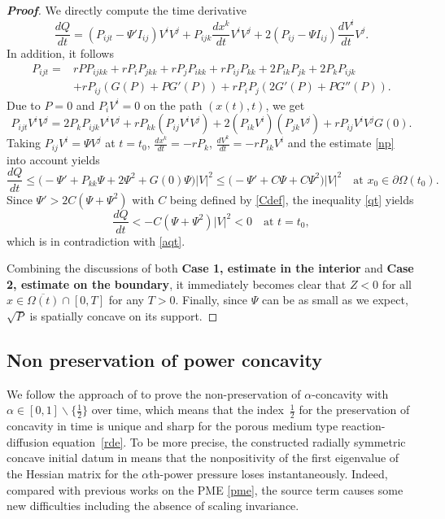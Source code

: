 \documentclass[10pt]{article}         %
\numberwithin{equation}{section}
\begin{document}
\begin{proof}[\bf Proof]
We directly compute the time derivative 
\[\frac{dQ}{dt}=(P_{ijt}-\Psi' I_{ij})V^iV^j+P_{ijk}\frac{dx^k}{dt}V^iV^j+2(P_{ij}-\Psi I_{ij})\frac{dV^i}{dt}V^j.\]
In addition, it follows 
\begin{equation*}
\begin{aligned}P_{ijt}=&rPP_{ijkk}+rP_iP_{jkk}+rP_jP_{ikk}+rP_{ij}P_{kk}+2P_{ik}P_{jk}+2P_{k}P_{ijk}\\
&+rP_{ij}(G(P)+PG'(P))+rP_iP_j(2G'(P)+PG''(P)).
\end{aligned}
\end{equation*}
Due to $P=0$ and $P_iV^i=0$ on the path $(x(t),t)$, we get 
\[P_{ijt}V^iV^j=2P_{k}P_{ijk}V^iV^j+rP_{kk}(P_{ij}V^iV^j)+2(P_{ik}V^i)(P_{jk}V^j)+rP_{ij}V^iV^jG(0).\]
Taking  $P_{ij}V^i=\Psi V^j$ at $t=t_0$, $\frac{dx^k}{dt}=-rP_k$, $\frac{dV^k}{dt}=-rP_{ik}V^i$ and the estimate \eqref{np} into account yields 
\begin{equation}\label{qt}
\frac{dQ}{dt}\leq \big(-\Psi'+P_{kk}\Psi+2\Psi^2+G(0)\Psi \big)|V|^2\leq \big(-\Psi'+C\Psi+C\Psi^2 \big)|V|^2 \quad\text{at }x_0\in\partial\Omega(t_0).
\end{equation}
Since  $\Psi'>2C(\Psi+\Psi^2)$ with $C$ being defined by \eqref{Cdef}, the inequality \eqref{qt} yields
\[\frac{dQ}{dt}<-C(\Psi+\Psi^2)|V|^2<0\quad\text{at }t=t_0,\] 
which is in contradiction with \eqref{aqt}.

\vspace{2mm}

Combining the discussions of both  \textbf{Case 1, estimate in the interior} and \textbf{Case 2, estimate on the boundary}, it immediately becomes clear that $Z<0$ for all $x\in \overline{\Omega(t)}\cap [0,T]$ for any $T>0$. Finally, since $\Psi$ can be as small as we expect, $\sqrt{P}$ is spatially concave on its support. 
\end{proof}
\subsection{Non preservation of power concavity}
We follow the approach of \cite{ST2024,CW2024} to prove the non-preservation of $\alpha$-concavity with $\alpha\in[0,1]\backslash\{\frac{1}{2}\}$ over time, which means that the index~$\frac{1}{2}$ for the preservation of concavity in time is unique and sharp for the porous medium type reaction-diffusion equation~\eqref{rde}.  To be more precise, the constructed radially symmetric concave initial datum in \cite{ST2024,CW2024} means that the nonpositivity of the first eigenvalue of the Hessian matrix for the $\alpha$th-power pressure loses instantaneously. Indeed, compared with previous works \cite{ST2024,CW2024} on the  PME \eqref{pme}, the source term causes some new difficulties including the absence of scaling invariance. 
\end{document}
